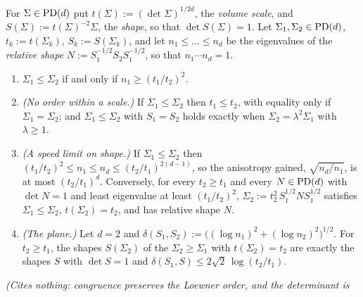 \begin{lemma}
\label{lem:loewner-scale-shape}
\leanok
For $\Sigma \in \mathrm{PD}(d)$ put $t(\Sigma) := (\det\Sigma)^{1/2d}$, the \emph{volume scale}, and
$S(\Sigma) := t(\Sigma)^{-2}\Sigma$, the \emph{shape}, so that $\det S(\Sigma) = 1$. Let
$\Sigma_1, \Sigma_2 \in \mathrm{PD}(d)$, $t_k := t(\Sigma_k)$, $S_k := S(\Sigma_k)$, and let
$n_1 \le \dots \le n_d$ be the eigenvalues of the \emph{relative shape}
$N := S_1^{-1/2}S_2S_1^{-1/2}$, so that $n_1 \cdots n_d = 1$.
\begin{enumerate}
\item $\Sigma_1 \le \Sigma_2$ if and only if $n_1 \ge (t_1/t_2)^2$.
\item \emph{(No order within a scale.)} If $\Sigma_1 \le \Sigma_2$ then $t_1 \le t_2$, with
equality only if $\Sigma_1 = \Sigma_2$; and $\Sigma_1 \le \Sigma_2$ with $S_1 = S_2$ holds exactly
when $\Sigma_2 = \lambda^2\Sigma_1$ with $\lambda \ge 1$.
\item \emph{(A speed limit on shape.)} If $\Sigma_1 \le \Sigma_2$ then
$(t_1/t_2)^2 \le n_1 \le n_d \le (t_2/t_1)^{2(d-1)}$, so the anisotropy gained,
$\sqrt{n_d/n_1}$, is at most $(t_2/t_1)^d$. Conversely, for every $t_2 \ge t_1$ and every
$N \in \mathrm{PD}(d)$ with $\det N = 1$ and least eigenvalue at least $(t_1/t_2)^2$,
$\Sigma_2 := t_2^2\,S_1^{1/2}NS_1^{1/2}$ satisfies $\Sigma_1 \le \Sigma_2$, $t(\Sigma_2) = t_2$, and
has relative shape $N$.
\item \emph{(The plane.)} Let $d = 2$ and
$\delta(S_1,S_2) := \bigl((\log n_1)^2 + (\log n_2)^2\bigr)^{1/2}$. For $t_2 \ge t_1$, the shapes
$S(\Sigma_2)$ of the $\Sigma_2 \ge \Sigma_1$ with $t(\Sigma_2) = t_2$ are exactly the shapes $S$
with $\det S = 1$ and $\delta(S_1,S) \le 2\sqrt2\,\log(t_2/t_1)$.
\end{enumerate}
\statusT\quad\emph{(Cites nothing: congruence preserves the Loewner order, and the determinant is
}
\end{lemma}
